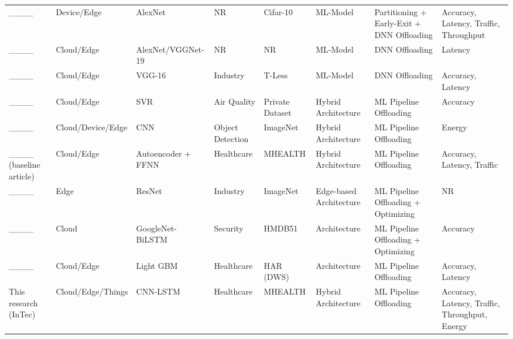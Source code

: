 \begin{landscape}
\begin{longtable}{@{}p{1.5cm}p{3.5cm}p{2.5cm}p{2.5cm}p{2.5cm}p{3cm}p{5cm}p{2.2cm}@{}}
			____ & Device/Edge & AlexNet & NR & Cifar-10 & ML-Model & Partitioning + Early-Exit + DNN Offloading & Accuracy, Latency, Traffic, Throughput \\
			____ & Cloud/Edge & AlexNet/VGGNet-19 & NR & NR & ML-Model & DNN Offloading & Latency \\
			____ & Cloud/Edge & VGG-16 & Industry & T-Less & ML-Model & DNN Offloading & Accuracy, Latency \\
			____ & Cloud/Edge & SVR & Air Quality & Private Dataset & Hybrid Architecture & ML Pipeline Offloading & Accuracy \\
			____ & Cloud/Device/Edge & CNN & Object Detection & ImageNet & Hybrid Architecture & ML Pipeline Offloading & Energy \\
			____  (baseline article) & Cloud/Edge & Autoencoder + FFNN & Healthcare & MHEALTH & Hybrid Architecture & ML Pipeline Offloading & Accuracy, Latency, Traffic \\
			____ & Edge & ResNet & Industry & ImageNet & Edge-based Architecture & ML Pipeline Offloading + Optimizing & NR \\
			____ & Cloud & GoogleNet-BiLSTM & Security & HMDB51 & Architecture & ML Pipeline Offloading + Optimizing & Accuracy \\
			____ & Cloud/Edge & Light GBM & Healthcare & HAR (DWS) & Architecture & ML Pipeline Offloading & Accuracy, Latency \\
			This research (InTec) & Cloud/Edge/Things & CNN-LSTM & Healthcare & MHEALTH & Hybrid Architecture & ML Pipeline Offloading & Accuracy, Latency, Traffic, Throughput, Energy \\
		\end{longtable}
		

\end{landscape}
